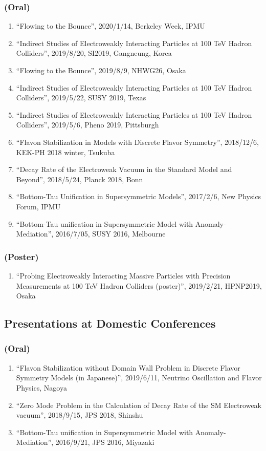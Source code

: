 \documentclass[12pt]{article}
\begin{document}
\subsubsection*{(Oral)}
\begin{enumerate}
 \item ``Flowing to the Bounce'', 2020/1/14, Berkeley Week, IPMU
 \item ``Indirect Studies of Electroweakly Interacting Particles at 100 TeV Hadron Colliders'', 2019/8/20, SI2019, Gangneung, Korea
 \item ``Flowing to the Bounce'', 2019/8/9, NHWG26, Osaka
 \item ``Indirect Studies of Electroweakly Interacting Particles at 100 TeV Hadron Colliders'', 2019/5/22, SUSY 2019, Texas
 \item ``Indirect Studies of Electroweakly Interacting Particles at 100 TeV Hadron Colliders'', 2019/5/6, Pheno 2019, Pittsburgh
 \item ``Flavon Stabilization in Models with Discrete Flavor Symmetry'', 2018/12/6, KEK-PH 2018 winter, Tsukuba
 \item ``Decay Rate of the Electroweak Vacuum in the Standard Model and Beyond'', 2018/5/24, Planck 2018, Bonn
 \item ``Bottom-Tau Unification in Supersymmetric Models'', 2017/2/6, New Physics Forum, IPMU
 \item ``Bottom-Tau unification in Supersymmetric Model with Anomaly-Mediation'', 2016/7/05, SUSY 2016, Melbourne
\end{enumerate}
\subsubsection*{(Poster)}
\begin{enumerate}
 \item ``Probing Electroweakly Interacting Massive Particles with Precision Measurements at 100 TeV Hadron Colliders (poster)'', 2019/2/21, HPNP2019, Osaka
\end{enumerate}

\subsection*{Presentations at Domestic Conferences}
\subsubsection*{(Oral)}
\begin{enumerate}
 \item ``Flavon Stabilization without Domain Wall Problem in Discrete Flavor Symmetry Models (in Japanese)'', 2019/6/11, Neutrino Oscillation and Flavor Physics, Nagoya
 \item ``Zero Mode Problem in the Calculation of Decay Rate of the SM Electroweak vacuum'', 2018/9/15, JPS 2018, Shinshu
 \item ``Bottom-Tau unification in Supersymmetric Model with Anomaly-Mediation'', 2016/9/21, JPS 2016, Miyazaki
\end{enumerate}
\end{document}
